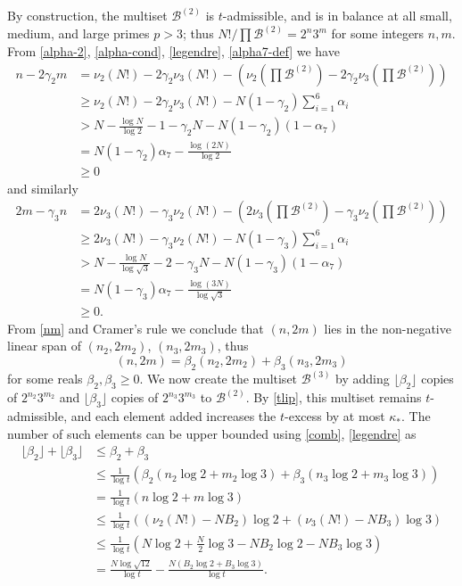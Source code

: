 \documentclass[10pt,a4paper,reqno]{amsart}
\numberwithin{equation}{section}
\theoremstyle{plain}
\theoremstyle{definition}
\newcommand\tuple{{\mathcal B}}
\begin{document}
By construction, the multiset $\tuple^{(2)}$ is $t$-admissible, and is in balance at all small, medium, and large primes $p > 3$; thus $N!/\prod \tuple^{(2)} = 2^n 3^m$ for some integers $n,m$.  From \eqref{alpha-2}, \eqref{alpha-cond}, \eqref{legendre}, \eqref{alpha7-def} we have
\begin{align*}
n - 2\gamma_2 m &= \nu_2(N!) - 2\gamma_2 \nu_3(N!) - \left(\nu_2\left(\prod \tuple^{(2)}\right) - 2\gamma_2 \nu_3\left(\prod \tuple^{(2)}\right)\right) \\
&\geq \nu_2(N!) - 2\gamma_2 \nu_3(N!) - N (1-\gamma_2) \sum_{i=1}^6 \alpha_i \\
&> N -
 \frac{\log N}{\log 2} - 1 - \gamma_2 N - N (1-\gamma_2) (1 - \alpha_7) \\
&= N (1-\gamma_2) \alpha_7 - \frac{\log(2N)}{\log 2} \\
&\geq 0
\end{align*}
and similarly
\begin{align*}
  2m - \gamma_3 n &= 2\nu_3(N!) - \gamma_3 \nu_2(N!) - \left(2\nu_3\left(\prod \tuple^{(2)}\right) - \gamma_3 \nu_2\left(\prod \tuple^{(2)}\right)\right) \\
&\geq 2\nu_3(N!) - \gamma_3 \nu_2(N!) - N (1-\gamma_3) \sum_{i=1}^6 \alpha_i \\
&> N - \frac{\log N}{\log \sqrt{3}} - 2 - \gamma_3 N - N (1-\gamma_3) (1 - \alpha_7) \\
&= N (1-\gamma_3) \alpha_7 - \frac{\log(3N)}{\log \sqrt{3}} \\
&\geq 0.
\end{align*}
From \eqref{nm} and Cramer's rule we conclude that $(n,2m)$ lies in the non-negative linear span of $(n_2, 2m_2)$, $(n_3, 2m_3)$, thus
\begin{equation}\label{comb}  (n,2m) = \beta_2 (n_2,2m_2) + \beta_3 (n_3,2m_3)\end{equation}
for some reals $\beta_2,\beta_3 \geq 0$.
We now create the multiset $\tuple^{(3)}$ by adding $\lfloor \beta_2 \rfloor$ copies of $2^{n_2} 3^{m_2}$ and $\lfloor \beta_3 \rfloor$ copies of $2^{n_3} 3^{m_3}$ to $\tuple^{(2)}$.  By \eqref{tlip}, this multiset remains $t$-admissible, and each element added increases the $t$-excess by at most $\kappa_*$.  The number of such elements can be upper bounded using \eqref{comb}, \eqref{legendre} as
\begin{align*}
  \lfloor \beta_2 \rfloor + \lfloor \beta_3 \rfloor &\leq \beta_2 + \beta_3 \\
  &\leq \frac{1}{\log t} \left( \beta_2 (n_2 \log 2 + m_2 \log 3) + \beta_3 (n_3 \log 2 + m_3 \log 3) \right) \\
  &= \frac{1}{\log t} (n \log 2 + m \log 3) \\
  &\leq \frac{1}{\log t} ((\nu_2(N!)-NB_2) \log 2 + (\nu_3(N!)-NB_3) \log 3) \\
  &\leq \frac{1}{\log t} \left(N \log 2 + \frac{N}{2} \log 3 - NB_2 \log 2 - NB_3 \log 3\right) \\
  &= \frac{N \log \sqrt{12}}{\log t} - \frac{N(B_2 \log 2 + B_3 \log 3)}{\log t}.
\end{align*}
\end{document}
